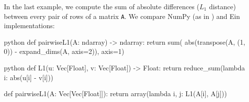 In the last example, we compute the sum of absolute differences ($L_1$ distance) between every pair of rows of a matrix \texttt{A}. 
We compare NumPy (as in \cite{maclaurin2019dex}) and Ein implementations:
\begin{center}    
\begin{minipage}[t]{.5\textwidth}
\raggedright
\begin{center}    
  \begin{cminted}{python}
def pairwiseL1(A: ndarray) -> ndarray:
  return sum(
    abs(transpose(A, (1, 0)) 
        - expand_dims(A, axis=2)),
    axis=1)
  \end{cminted}
\end{center}
\end{minipage}%
\begin{minipage}[t]{.5\textwidth}
\raggedleft
\begin{center}    
  \begin{cminted}{python}
def L1(u: Vec[Float], v: Vec[Float]) -> Float:
  return reduce_sum(lambda i: abs(u[i] - v[i]))

def pairwiseL1(A: Vec[Vec[Float]]):
  return array(lambda i, j: L1(A[i], A[j]))
  \end{cminted}
\end{center}
\end{minipage}
\end{center}
